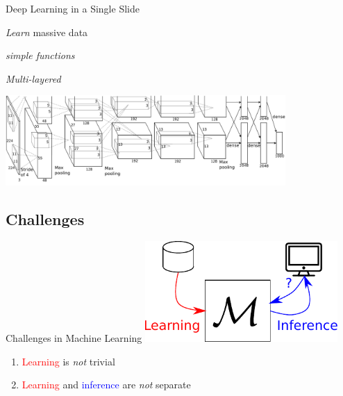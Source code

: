 \documentclass{beamer}
\newcommand{\tred}[1]{\textcolor{red}{#1}}
\newcommand{\tblue}[1]{\textcolor{blue}{#1}}
\begin{document}
\begin{frame}{Deep Learning in a Single Slide}
     \begin{minipage}{0.32\textwidth}
         \centering
         \small
         \textit{Learn} massive data
     \end{minipage}
     \hfill
     \begin{minipage}{0.32\textwidth}
         \centering
         \small
         \textit{simple functions}
     \end{minipage}
     \hfill
     \begin{minipage}{0.32\textwidth}
         \centering
         \small
         \textit{Multi-layered} 
     \end{minipage}

     \vspace{3mm}
    \centering
    \includegraphics[width=0.8\textwidth]{alex_imagenet}
    \\

    \vfill


\end{frame}

\subsection{Challenges}

\begin{frame}{Challenges in Machine Learning}
    \centering
    \includegraphics[width=0.55\textwidth]{machinelearning.pdf}

    \vspace{4mm}
    \raggedright
    \begin{enumerate}
        \item \tred{Learning} is \emph{not} trivial 
        \item \tred{Learning} and \tblue{inference} are \emph{not} separate
    \end{enumerate}
\end{frame}
\end{document}

